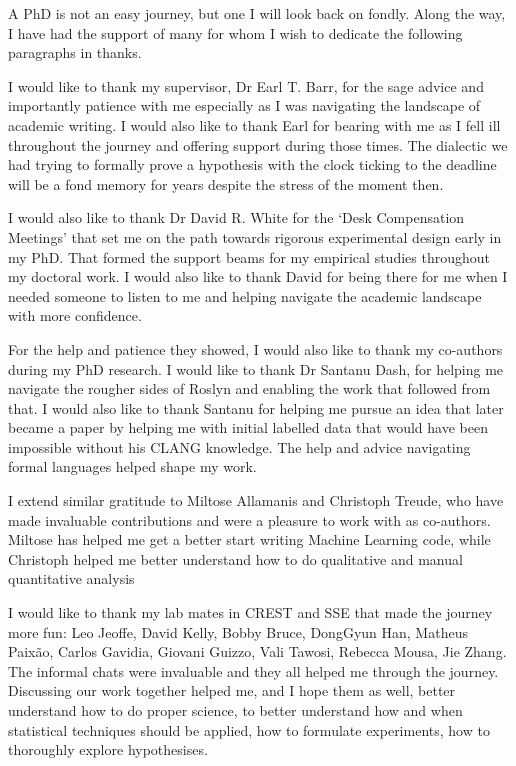 \begin{acknowledgements}
A PhD is not an easy journey, but one I will look back on fondly. Along the way,
I have had the support of many for whom I wish to dedicate the following
paragraphs in thanks.

I would like to thank my supervisor, Dr Earl T. Barr, for the sage advice and
importantly patience with me especially as I was navigating the landscape of
academic writing. I would also like to thank Earl for bearing with me as I fell
ill throughout the journey and offering support during those times. The
dialectic we had trying to formally prove a hypothesis with the clock ticking to
the deadline will be a fond memory for years despite the stress of the moment
then.

I would also like to thank Dr David R. White for the `Desk Compensation
Meetings' that set me on the path towards rigorous experimental design early in
my PhD. That formed the support beams for my empirical studies throughout my
doctoral work. I would also like to thank David for being there for me when I
needed someone to listen to me and helping navigate the academic landscape with
more confidence.

For the help and patience they showed, I would also like to thank my co-authors
during my PhD research. I would like to thank Dr Santanu Dash, for helping me
navigate the rougher sides of Roslyn and enabling the work that followed from
that. I would also like to thank Santanu for helping me pursue an idea that
later became a paper by helping me with initial labelled data that would have
been impossible without his CLANG knowledge. The help and advice navigating
formal languages helped shape my work.

I extend similar gratitude to Miltose Allamanis and Christoph Treude, who have
made invaluable contributions and were a pleasure to work with as co-authors.
Miltose has helped me get a better start writing Machine Learning code, while
Christoph helped me better understand how to do qualitative and manual
quantitative analysis

I would like to thank my lab mates in CREST and SSE that made the journey more
fun: Leo Jeoffe, David Kelly, Bobby Bruce, DongGyun Han, Matheus Paix\~ao,
Carlos Gavidia, Giovani Guizzo, Vali Tawosi, Rebecca Mousa, Jie Zhang. The
informal chats were invaluable and they all helped me through the journey.
Discussing our work together helped me, and I hope them as well, better
understand how to do proper science, to better understand how and when
statistical techniques should be applied, how to formulate experiments, how to
thoroughly explore hypothesises.


\end{acknowledgements}
